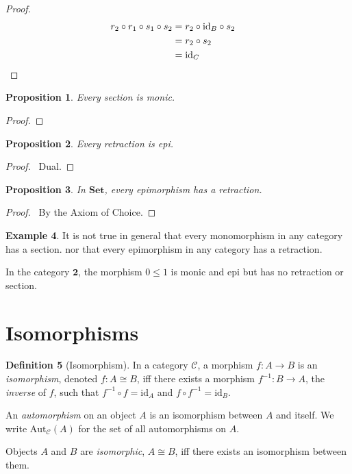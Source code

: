 \documentclass{book}
\let\qed\relax
\newtheorem{prop}{Proposition}[chapter]
\theoremstyle{definition}
\newtheorem{df}[prop]{Definition}
\newtheorem{ex}[prop]{Example}
\newcommand{\id}[1]{\ensuremath{\mathrm{id}_{#1}}}
\newcommand{\Set}{\ensuremath{\mathbf{Set}}}
\begin{document}
\begin{proof}
    \pf
    \begin{align*}
        r_2 \circ r_1 \circ s_1 \circ s_2 & = r_2 \circ \id{B} \circ s_2        \\
                                          & = r_2 \circ s_2                     \\
                                          & = \id{C}                     & \qed
    \end{align*}
\end{proof}

\begin{prop}
    Every section is monic.
\end{prop}

\begin{proof}
    \pf
    \qed
\end{proof}

\begin{prop}
    Every retraction is epi.
\end{prop}

\begin{proof}
    \pf\ Dual. \qed
\end{proof}

\begin{prop}
    In $\Set$, every epimorphism has a retraction.
\end{prop}

\begin{proof}
    \pf\ By the Axiom of Choice. \qed
\end{proof}

\begin{ex}
    It is not true in general that every monomorphism in any category has a section. nor that every epimorphism in any category has a retraction.

    In the category $\mathbf{2}$, the morphism $0 \leq 1$ is monic and epi but has
    no retraction or section.
\end{ex}


\section{Isomorphisms}

\begin{df}[Isomorphism]
    In a category $\mathcal{C}$, a morphism $f : A \rightarrow B$ is an \emph{isomorphism}, denoted $f : A \cong B$, iff there exists a morphism $f^{-1} : B \rightarrow A$, the \emph{inverse} of $f$, such that $f^{-1} \circ f = \id{A}$ and $f \circ f^{-1} = \id{B}$.

    An \emph{automorphism} on an object $A$ is an isomorphism between $A$ and
    itself. We write $\mathrm{Aut}_\mathcal{C}(A)$ for the set of all automorphisms
    on $A$.

    Objects $A$ and $B$ are \emph{isomorphic}, $A \cong B$, iff there exists an
    isomorphism between them.
\end{df}
\end{document}
